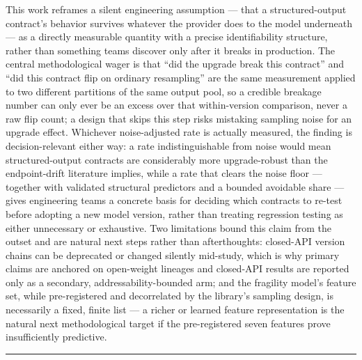 \documentclass[11pt]{article}
\begin{document}
This work reframes a silent engineering assumption --- that a structured-output contract's behavior survives whatever the provider does to the model underneath --- as a directly measurable quantity with a precise identifiability structure, rather than something teams discover only after it breaks in production. The central methodological wager is that ``did the upgrade break this contract'' and ``did this contract flip on ordinary resampling'' are the same measurement applied to two different partitions of the same output pool, so a credible breakage number can only ever be an excess over that within-version comparison, never a raw flip count; a design that skips this step risks mistaking sampling noise for an upgrade effect. Whichever noise-adjusted rate is actually measured, the finding is decision-relevant either way: a rate indistinguishable from noise would mean structured-output contracts are considerably more upgrade-robust than the endpoint-drift literature implies, while a rate that clears the noise floor --- together with validated structural predictors and a bounded avoidable share --- gives engineering teams a concrete basis for deciding which contracts to re-test before adopting a new model version, rather than treating regression testing as either unnecessary or exhaustive. Two limitations bound this claim from the outset and are natural next steps rather than afterthoughts: closed-API version chains can be deprecated or changed silently mid-study, which is why primary claims are anchored on open-weight lineages and closed-API results are reported only as a secondary, addressability-bounded arm; and the fragility model's feature set, while pre-registered and decorrelated by the library's sampling design, is necessarily a fixed, finite list --- a richer or learned feature representation is the natural next methodological target if the pre-registered seven features prove insufficiently predictive.

{\small}

\vspace{1em}
\hrule
\vspace{1em}
\end{document}
